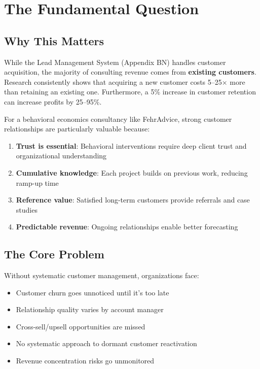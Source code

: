 \section{The Fundamental Question}
\label{sec:bp-fundamental}

\subsection{Why This Matters}

While the Lead Management System (Appendix BN) handles customer acquisition,
the majority of consulting revenue comes from \textbf{existing customers}.
Research consistently shows that acquiring a new customer costs 5--25× more
than retaining an existing one. Furthermore, a 5\% increase in customer
retention can increase profits by 25--95\%.

For a behavioral economics consultancy like FehrAdvice, strong customer
relationships are particularly valuable because:
\begin{enumerate}
\item \textbf{Trust is essential}: Behavioral interventions require deep
      client trust and organizational understanding
\item \textbf{Cumulative knowledge}: Each project builds on previous work,
      reducing ramp-up time
\item \textbf{Reference value}: Satisfied long-term customers provide
      referrals and case studies
\item \textbf{Predictable revenue}: Ongoing relationships enable better
      forecasting
\end{enumerate}

\subsection{The Core Problem}

Without systematic customer management, organizations face:
\begin{itemize}
\item Customer churn goes unnoticed until it's too late
\item Relationship quality varies by account manager
\item Cross-sell/upsell opportunities are missed
\item No systematic approach to dormant customer reactivation
\item Revenue concentration risks go unmonitored
\end{itemize}

